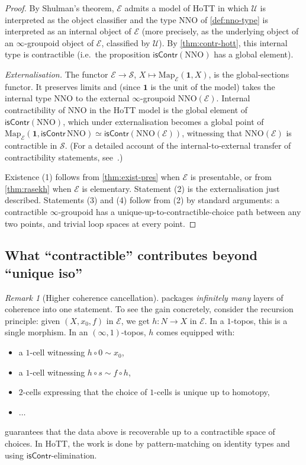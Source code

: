 \documentclass[12pt]{article}
\theoremstyle{definition}
\theoremstyle{remark}
\newtheorem{remark}[theorem]{Remark}
\newcommand{\Map}{\mathrm{Map}}
\newcommand{\eqv}{\simeq}
\newcommand{\NNO}{\mathrm{NNO}}
\newcommand{\U}{\mathcal{U}}
\newcommand{\isContr}{\mathsf{isContr}}
\newcommand{\Spc}{\mathcal{S}}
\begin{document}
\begin{proof}
By Shulman's theorem, $\mathcal{E}$ admits a model of HoTT in which $\U$ is interpreted as the object classifier and the type $\NNO$ of \cref{def:nno-type} is interpreted as an internal object of $\mathcal{E}$ (more precisely, as the underlying object of an $\infty$-groupoid object of $\mathcal{E}$, classified by $\U$). By \cref{thm:contr-hott}, this internal type is contractible (i.e.\ the proposition $\isContr(\NNO)$ has a global element).

\emph{Externalisation.} The functor $\mathcal{E}\to \Spc$, $X\mapsto \Map_{\mathcal{E}}(\mathbf{1},X)$, is the global-sections functor. It preserves limits and (since $\mathbf{1}$ is the unit of the model) takes the internal type $\NNO$ to the external $\infty$-groupoid $\mathrm{NNO}(\mathcal{E})$. Internal contractibility of $\NNO$ in the HoTT model is the global element of $\isContr(\NNO)$, which under externalisation becomes a global point of $\Map_{\mathcal{E}}(\mathbf{1},\isContr\,\NNO)\eqv\isContr(\mathrm{NNO}(\mathcal{E}))$, witnessing that $\mathrm{NNO}(\mathcal{E})$ is contractible in $\Spc$. (For a detailed account of the internal-to-external transfer of contractibility statements, see~\cite{KapulkinLumsdaine}.)

Existence (1) follows from \cref{thm:exist-pres} when $\mathcal{E}$ is presentable, or from \cref{thm:rasekh} when $\mathcal{E}$ is elementary. Statement (2) is the externalisation just described. Statements (3) and (4) follow from (2) by standard arguments: a contractible $\infty$-groupoid has a unique-up-to-contractible-choice path between any two points, and trivial loop spaces at every point.
\end{proof}

\subsection{What ``contractible'' contributes beyond ``unique iso''}

\begin{remark}[Higher coherence cancellation]
 packages \emph{infinitely many} layers of coherence into one statement. To see the gain concretely, consider the recursion principle: given $(X,x_{0},f)$ in $\mathcal{E}$, we get $h\colon N\to X$ in $\mathcal{E}$. In a $1$-topos, this is a single morphism. In an $(\infty,1)$-topos, $h$ comes equipped with:
\begin{itemize}
  \item a $1$-cell witnessing $h\circ 0\sim x_{0}$,
  \item a $1$-cell witnessing $h\circ s\sim f\circ h$,
  \item $2$-cells expressing that the choice of $1$-cells is unique up to homotopy,
  \item $\ldots$
\end{itemize}
 guarantees that the data above is recoverable up to a contractible space of choices. In HoTT, the work is done by pattern-matching on identity types and using $\isContr$-elimination.
\end{remark}
\end{document}
